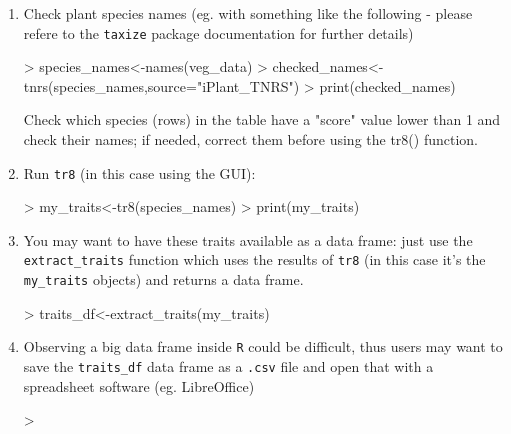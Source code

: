 \documentclass{article}
\begin{document}
  \begin{enumerate}
  \item Check plant species names (eg. with something like the following -  please refere to the \texttt{taxize} package documentation\cite{taxize} for further details)
    
\begin{Schunk}
\begin{Sinput}
> species_names<-names(veg_data)
> checked_names<-tnrs(species_names,source="iPlant_TNRS")
> print(checked_names)
\end{Sinput}
\end{Schunk}

 Check which species (rows) in the table have a "score" value
 lower than 1 and check their names; if needed, correct them
 before using the tr8() function.
\item Run \texttt{tr8}  (in this case using the GUI):

\begin{Schunk}
\begin{Sinput}
> my_traits<-tr8(species_names)
> print(my_traits)
\end{Sinput}
\end{Schunk}
 
\item You may want to have these traits available as a data frame:
  just use the \texttt{extract\_traits} function which uses the results
  of \texttt{tr8} (in this case it's the \texttt{my\_traits} objects)
  and returns a data frame.

\begin{Schunk}
\begin{Sinput}
> traits_df<-extract_traits(my_traits)
\end{Sinput}
\end{Schunk}

\item Observing a big data frame inside \texttt{R} could be difficult,
  thus users may want to save the \texttt{traits\_df} data frame as a
  \texttt{.csv} file and open that with a spreadsheet software (eg. LibreOffice)
 
\begin{Schunk}
\begin{Sinput}
> 
\end{Sinput}
\end{Schunk}
  
  
  \end{enumerate}
  
\end{document}
